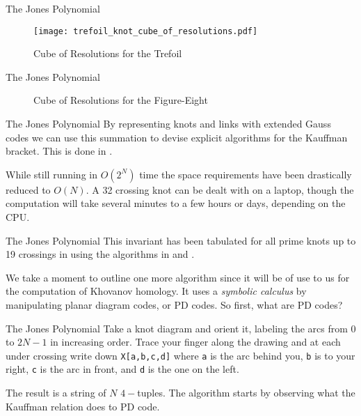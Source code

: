 \documentclass{beamer}
\begin{document}
    \begin{frame}{The Jones Polynomial}
        \begin{figure}
            \centering
            \texttt{[image: trefoil\_knot\_cube\_of\_resolutions.pdf]}
            \caption{Cube of Resolutions for the Trefoil}
        \end{figure}
    \end{frame}
    \begin{frame}{The Jones Polynomial}
        \begin{figure}
            \centering
            \caption{Cube of Resolutions for the Figure-Eight}
        \end{figure}
    \end{frame}
    \begin{frame}{The Jones Polynomial}
        By representing knots and links with extended Gauss codes we can
        use this summation to devise explicit algorithms for the Kauffman
        bracket. This is done in \cite{MaguireJones}.
        \par\hfill\par
        While still running in
        $O(2^{N})$ time the space requirements have been drastically reduced
        to $O(N)$. A 32 crossing knot can be dealt with on a laptop, though
        the computation will take several minutes to a few hours or days,
        depending on the CPU.
    \end{frame}
    \begin{frame}{The Jones Polynomial}
        This invariant has been tabulated for all prime knots up to 19 crossings
        in \cite{JonesData} using the algorithms in \cite{MaguireJones} and
        \cite{Burton2018HOMFLFixedParameter}.
        \par\hfill\par
        We take a moment to outline one more algorithm since it will be of
        use to us for the computation of Khovanov homology. It uses a
        \textit{symbolic calculus} by manipulating planar diagram codes,
        or PD codes. So first, what are PD codes?
    \end{frame}
    \begin{frame}{The Jones Polynomial}
        Take a knot diagram and orient it, labeling the arcs from $0$ to
        $2N-1$ in increasing order. Trace your finger along the drawing and at
        each under crossing write down \texttt{X[a,b,c,d]} where
        \texttt{a} is the arc behind you, \texttt{b} is to your right,
        \texttt{c} is the arc in front, and \texttt{d} is the one on the left.
        \par\hfill\par
        The result is a string of $N$ $4-$tuples. The algorithm starts by
        observing what the Kauffman relation does to PD code.
    \end{frame}
\end{document}
